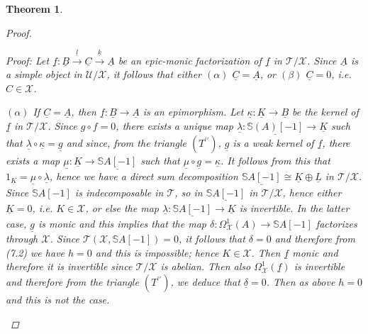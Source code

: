 \documentclass[oneside, a4paper,reqno]{amsart}
\numberwithin{equation}{section}
\newtheorem{thm}{Theorem}[section]
\theoremstyle{definition}
\begin{document}
\begin{thm}
\begin{proof}
\begin{enumerate}
  {\em Proof:} Let  ${\underline f} \colon {\underline B} \stackrel{\underline{l}}{\longrightarrow} {\underline C} \stackrel{\underline{k}}{\longrightarrow} {\underline A}$ be an epic-monic  factorization of ${\underline f}$ in ${\mathcal T}/{\mathcal X}$. Since ${\underline A}$ is a simple object  in ${\mathcal U}/{\mathcal X}$,  it follows that either $(\alpha)$ ${\underline C} = {\underline A}$,  or $(\beta)$ ${\underline C} = 0$, i.e. $C \in {\mathcal X}$. 
  
 $(\alpha)$ If ${\underline C} = {\underline A}$, then ${\underline f} \colon {\underline B} {\longrightarrow} {\underline A}$ is an epimorphism. Let $\underline{\kappa} \colon {\underline K} {\longrightarrow} {\underline B}$ be the kernel of ${\underline f}$ in ${\mathcal T}/{\mathcal X}$. Since $g \circ f = 0$, there exists a unique map $\underline{\lambda} \colon \underline{\mathbb S(A)[-1]} {\longrightarrow} {\underline K}$ such that $\underline{\lambda} \circ \underline{\kappa} = {\underline g}$ and since, from the triangle $(T^{\prime\prime})$, ${\underline g}$ is a weak kernel of ${\underline f}$, there exists a map $\underline{\mu} \colon {\underline K} {\longrightarrow} \underline{\mathbb S A[-1]}$ such that $\underline{\mu} \circ \underline{g} = \underline{\kappa}$. It follows from this that $1_{\underline{K}} =  \underline{\mu} \circ \underline{\lambda}$, hence we have a direct sum decomposition $\underline{\mathbb S A[-1]} \cong {\underline K} \oplus \underline{L}$ in ${\mathcal T}/{\mathcal X}$. Since $\mathbb S A[-1]$ is indecomposable in ${\mathcal T}$, so in $\underline{\mathbb S A[-1]}$ in ${\mathcal T}/{\mathcal X}$, hence either ${\underline K} = 0$, i.e. $K \in {\mathcal X}$, or else the map $\underline{\lambda} : \underline{\mathbb S A[-1]} {\longrightarrow} {\underline K}$ is invertible. In the latter case,  ${\underline g}$ is monic and this implies that the map $\delta \colon \Omega^{1}_{\mathcal X}(A) {\longrightarrow} \mathbb S A[-1]$ factorizes through ${\mathcal X}$. Since ${\mathcal T}({\mathcal X},\mathbb S A[-1]) = 0$, it follows that $\delta = 0$ and therefore from (7.2) we have $h = 0$ and this is impossible; hence  $K \in {\mathcal X}$. Then ${\underline f}$ monic and therefore it is invertible since ${\mathcal T}/{\mathcal X}$ is abelian. Then also $\Omega^{1}_{\mathcal X}({\underline f})$ is invertible and therefore from the triangle $(T^{\prime\prime})$, we deduce that $\underline{\delta} = 0$. Then as above $h = 0$ and this is not the case.  


\end{enumerate}
\end{proof}
\end{thm}
\end{document}
